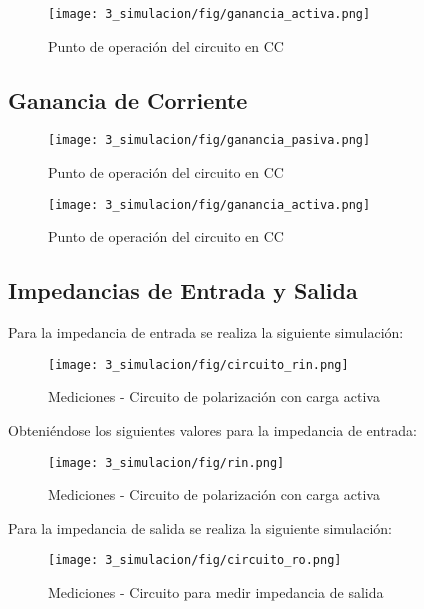 \begin{figure}[H]
    \centering
    \texttt{[image: 3\_simulacion/fig/ganancia\_activa.png]}
    \label{mediciones_pol_activa}
    \caption{Punto de operación del circuito en CC}
\end{figure}

\subsection{Ganancia de Corriente}

\begin{figure}[H]
    \centering
    \texttt{[image: 3\_simulacion/fig/ganancia\_pasiva.png]}
    \label{mediciones_pol_activa}
    \caption{Punto de operación del circuito en CC}
\end{figure}


\begin{figure}[H]
    \centering
    \texttt{[image: 3\_simulacion/fig/ganancia\_activa.png]}
    \label{mediciones_pol_activa}
    \caption{Punto de operación del circuito en CC}
\end{figure}



\subsection{Impedancias de Entrada y Salida}
Para la impedancia de entrada se realiza la siguiente simulación:
\begin{figure}[H]
    \centering
    \texttt{[image: 3\_simulacion/fig/circuito\_rin.png]}
    \label{mediciones_pol_activa}
    \caption{Mediciones - Circuito de polarización con carga activa}
\end{figure}
Obteniéndose los siguientes valores para la impedancia de entrada:
\begin{figure}[H]
    \centering
    \texttt{[image: 3\_simulacion/fig/rin.png]}
    \label{mediciones_pol_activa}
    \caption{Mediciones - Circuito de polarización con carga activa}
\end{figure}

Para la impedancia de salida se realiza la siguiente simulación:
\begin{figure}[H]
    \centering
    \texttt{[image: 3\_simulacion/fig/circuito\_ro.png]}
    \label{mediciones_pol_activa}
    \caption{Mediciones - Circuito para medir impedancia de salida}
\end{figure}

